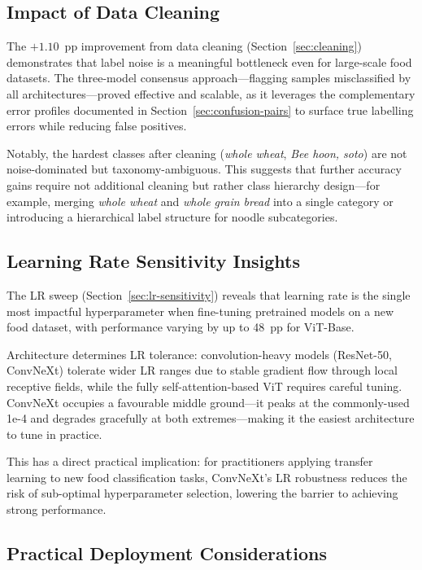 \subsection{Impact of Data Cleaning}\label{sec:discuss-cleaning}

The $+1.10$~pp improvement from data cleaning
(Section~\ref{sec:cleaning}) demonstrates that label noise is a
meaningful bottleneck even for large-scale food datasets.  The
three-model consensus approach---flagging samples misclassified by
all architectures---proved effective and scalable, as it leverages the
complementary error profiles documented in
Section~\ref{sec:confusion-pairs} to surface true labelling errors
while reducing false positives.

Notably, the hardest classes after cleaning (\emph{whole wheat},
\emph{Bee hoon, soto}) are not noise-dominated but
taxonomy-ambiguous.  This suggests that further accuracy gains require
not additional cleaning but rather class hierarchy design---for example,
merging \emph{whole wheat} and \emph{whole grain bread} into a single
category or introducing a hierarchical label structure for noodle
subcategories.

\subsection{Learning Rate Sensitivity Insights}\label{sec:discuss-lr}

The LR sweep (Section~\ref{sec:lr-sensitivity}) reveals that learning
rate is the single most impactful hyperparameter when fine-tuning
pretrained models on a new food dataset, with performance varying by up
to 48~pp for ViT-Base.

Architecture determines LR tolerance: convolution-heavy models
(ResNet-50, ConvNeXt) tolerate wider LR ranges due to stable gradient
flow through local receptive fields, while the fully self-attention-based
ViT requires careful tuning.  ConvNeXt occupies a favourable middle
ground---it peaks at the commonly-used 1e-4 and degrades gracefully at
both extremes---making it the easiest architecture to tune in practice.

This has a direct practical implication: for practitioners applying
transfer learning to new food classification tasks, ConvNeXt's LR
robustness reduces the risk of sub-optimal hyperparameter selection,
lowering the barrier to achieving strong performance.

\subsection{Practical Deployment Considerations}\label{sec:deployment}

